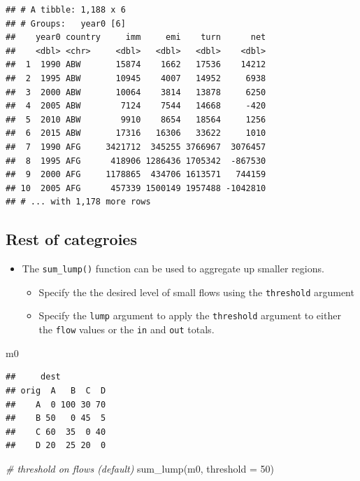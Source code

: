 \documentclass[
]{book}
\newenvironment{Shaded}{\begin{snugshade}}{\end{snugshade}}
\newcommand{\AttributeTok}[1]{\textcolor[rgb]{0.77,0.63,0.00}{#1}}
\newcommand{\CommentTok}[1]{\textcolor[rgb]{0.56,0.35,0.01}{\textit{#1}}}
\newcommand{\DecValTok}[1]{\textcolor[rgb]{0.00,0.00,0.81}{#1}}
\newcommand{\FunctionTok}[1]{\textcolor[rgb]{0.00,0.00,0.00}{#1}}
\newcommand{\NormalTok}[1]{#1}
\providecommand{\tightlist}{%
  \setlength{\itemsep}{0pt}\setlength{\parskip}{0pt}}
\begin{document}
\begin{verbatim}
## # A tibble: 1,188 x 6
## # Groups:   year0 [6]
##    year0 country     imm     emi    turn      net
##    <dbl> <chr>     <dbl>   <dbl>   <dbl>    <dbl>
##  1  1990 ABW       15874    1662   17536    14212
##  2  1995 ABW       10945    4007   14952     6938
##  3  2000 ABW       10064    3814   13878     6250
##  4  2005 ABW        7124    7544   14668     -420
##  5  2010 ABW        9910    8654   18564     1256
##  6  2015 ABW       17316   16306   33622     1010
##  7  1990 AFG     3421712  345255 3766967  3076457
##  8  1995 AFG      418906 1286436 1705342  -867530
##  9  2000 AFG     1178865  434706 1613571   744159
## 10  2005 AFG      457339 1500149 1957488 -1042810
## # ... with 1,178 more rows
\end{verbatim}

\hypertarget{rest-of-categroies}{%
\subsection{Rest of categroies}\label{rest-of-categroies}}

\begin{itemize}
\tightlist
\item
  The \texttt{sum\_lump()} function can be used to aggregate up smaller regions.

  \begin{itemize}
  \tightlist
  \item
    Specify the the desired level of small flows using the \texttt{threshold} argument
  \item
    Specify the \texttt{lump} argument to apply the \texttt{threshold} argument to either the \texttt{flow} values or the \texttt{in} and \texttt{out} totals.
  \end{itemize}
\end{itemize}

\begin{Shaded}
\begin{Highlighting}[]
\NormalTok{m0}
\end{Highlighting}
\end{Shaded}

\begin{verbatim}
##     dest
## orig  A   B  C  D
##    A  0 100 30 70
##    B 50   0 45  5
##    C 60  35  0 40
##    D 20  25 20  0
\end{verbatim}

\begin{Shaded}
\begin{Highlighting}[]
\CommentTok{\# threshold on flows (default)}
\FunctionTok{sum\_lump}\NormalTok{(m0, }\AttributeTok{threshold =} \DecValTok{50}\NormalTok{)}
\end{Highlighting}
\end{Shaded}
\end{document}

